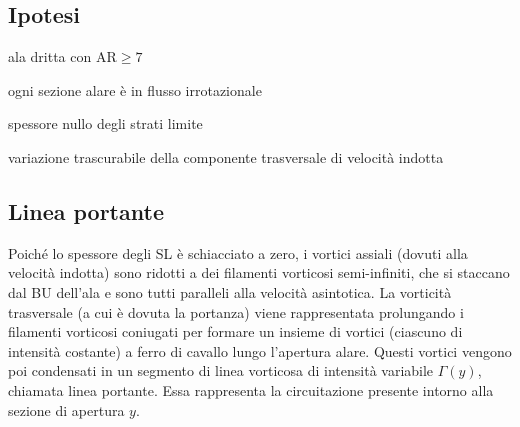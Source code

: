 \documentclass[11pt,a4paper]{report}
\newcommand{\sz}[1]{\scriptsize #1\normalsize}
\begin{document}
		\subsection{Ipotesi}	\label{hp linea}
		\begin{enumerate*}[label=$(\roman*)$]
			\item{ala dritta con $\mathrm{A\!R}\geq 7$}
			\item{ogni sezione alare è in  flusso irrotazionale}
			\item{spessore nullo degli strati limite}
			\item{variazione trascurabile della componente trasversale di velocità indotta}
		\end{enumerate*}
		\subsection{Linea portante}
		Poiché lo spessore degli SL è schiacciato a zero, i vortici assiali \sz{(dovuti alla velocità indotta)} sono ridotti a dei filamenti vorticosi semi-infiniti, che si staccano dal BU dell'ala e sono tutti paralleli alla velocità asintotica. La vorticità trasversale (a cui è dovuta la portanza) viene rappresentata prolungando i filamenti vorticosi coniugati per formare un insieme di vortici \sz{(ciascuno di intensità costante)} a ferro di cavallo lungo l'apertura alare. Questi vortici vengono poi condensati in un segmento di linea vorticosa di intensità variabile $\Gamma(y)$, chiamata linea portante. Essa rappresenta la circuitazione presente intorno alla sezione di apertura $y$.
\end{document}
